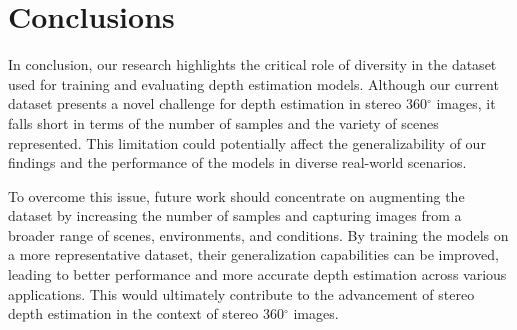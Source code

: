 \documentclass[english, LaM, oneside]{sapthesis}%
\begin{document}
\chapter{Conclusions}


In conclusion, our research highlights the critical role of diversity in the dataset used for training and evaluating depth estimation models. Although our current dataset presents a novel challenge for depth estimation in stereo 360$^\circ$ images, it falls short in terms of the number of samples and the variety of scenes represented. This limitation could potentially affect the generalizability of our findings and the performance of the models in diverse real-world scenarios.

To overcome this issue, future work should concentrate on augmenting the dataset by increasing the number of samples and capturing images from a broader range of scenes, environments, and conditions. By training the models on a more representative dataset, their generalization capabilities can be improved, leading to better performance and more accurate depth estimation across various applications. This would ultimately contribute to the advancement of stereo depth estimation in the context of stereo 360$^\circ$ images.
\end{document}
